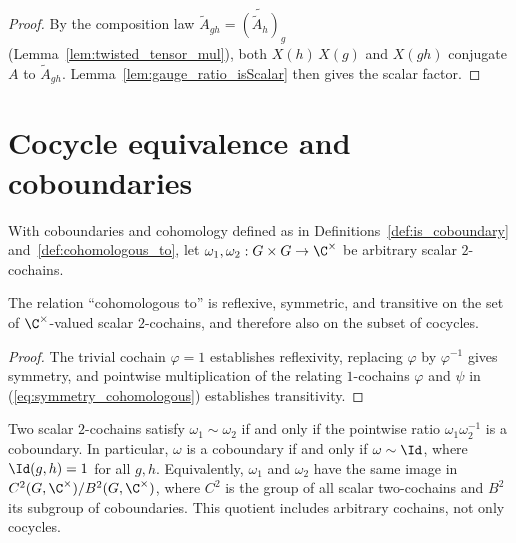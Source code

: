 \begin{proof}\leanok
    By the composition law $\widetilde{A}_{gh} = \widetilde{(\widetilde{A}_h)}_g$
    (Lemma~\ref{lem:twisted_tensor_mul}), both $X(h)\,X(g)$ and $X(gh)$
    conjugate $A$ to $\widetilde{A}_{gh}$.
    Lemma~\ref{lem:gauge_ratio_isScalar} then gives the scalar factor.
\end{proof}

\section{Cocycle equivalence and coboundaries}
\label{sec:app_symmetry_cocycles}

With coboundaries and cohomology defined as in
Definitions~\ref{def:is_coboundary} and~\ref{def:cohomologous_to}, let
$\omega_1,\omega_2:G\times G\to\C^\times$ be arbitrary scalar $2$-cochains.

\begin{lemma}%
    \label{thm:cohomologous_equivalence}
    \leanok
    The relation ``cohomologous to'' is reflexive, symmetric, and
    transitive on the set of $\C^\times$-valued scalar $2$-cochains, and
    therefore also on the subset of cocycles.
\end{lemma}

\begin{proof}\leanok{}
    The trivial cochain $\varphi=1$ establishes reflexivity, replacing $\varphi$
    by $\varphi^{-1}$ gives symmetry, and pointwise multiplication of the
    relating $1$-cochains $\varphi$ and $\psi$ in
    (\ref{eq:symmetry_cohomologous}) establishes transitivity.
\end{proof}


\begin{lemma}%
    \label{thm:coboundary_iff_cohomologous_one}
    \leanok
    Two scalar $2$-cochains satisfy $\omega_1\sim\omega_2$ if and only if
    the pointwise ratio $\omega_1\omega_2^{-1}$ is a coboundary. In
    particular, $\omega$ is a coboundary if and only if $\omega \sim \Id$,
    where $\Id(g,h)=1$ for all $g,h$.
    Equivalently, $\omega_1$ and $\omega_2$ have the same image in
    $C^2(G,\C^\times)/B^2(G,\C^\times)$, where $C^2$ is the group of all
    scalar two-cochains and $B^2$ its subgroup of coboundaries. This quotient
    includes arbitrary cochains, not only cocycles.
\end{lemma}

